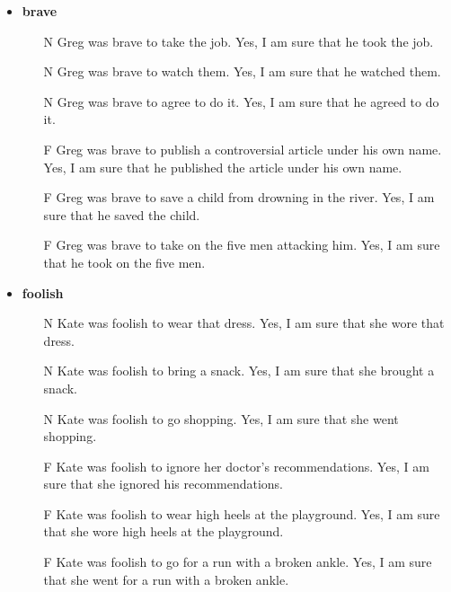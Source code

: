 \documentclass[11pt,fleqn]{article}
\newcommand{\6}{\mbox{$[\hspace*{-.6mm}[$}}
\newcommand{\9}{\mbox{$]\hspace*{-.6mm}]$}}
\begin{document}
\begin{itemize}[leftmargin=10pt,itemsep=-1pt]

\item {\bf brave}

\begin{enumerate}[leftmargin=10pt,topsep=0pt,itemsep=0pt]

\item[N]  	Greg was brave to take the job.	Yes, I am sure that he took the job.
\item[N]  	Greg was brave to watch them.	Yes, I am sure that he watched them.
\item[N]  	Greg was brave to agree to do it.	Yes, I am sure that he agreed to do it.
\item[F]  	Greg was brave to publish a controversial article under his own name.	Yes, I am sure that he published the article under his own name.
\item[F]  	Greg was brave to save a child from drowning in the river.	Yes, I am sure that he saved the child.
\item[F]  	Greg was brave to take on the five men attacking him.	Yes, I am sure that he took on the five men.

\end{enumerate}

\item {\bf foolish}

\begin{enumerate}[leftmargin=10pt,topsep=0pt,itemsep=0pt]

\item[N]  	Kate was foolish to wear that dress.	Yes, I am sure that she wore that dress.
\item[N]  	Kate was foolish to bring a snack.	Yes, I am sure that she brought a snack.
\item[N]  	Kate was foolish to go shopping.	Yes, I am sure that she went shopping.
\item[F]  	Kate was foolish to ignore her doctor's recommendations.	Yes, I am sure that she ignored his recommendations.
\item[F]  	Kate was foolish to wear high heels at the playground.	Yes, I am sure that she wore high heels at the playground.
\item[F]  	Kate was foolish to go for a run with a broken ankle.	Yes, I am sure that she went for a run with a broken ankle.

\end{enumerate}


\end{itemize}
\end{document}
